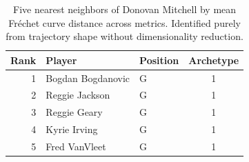 \begin{table}[htbp]
  \centering\small
  \begin{tabular}{rllc}
    \toprule
    Rank & Player & Position & Archetype \\
    \midrule
    1 & Bogdan Bogdanovic & G & 1 \\
    2 & Reggie Jackson & G & 1 \\
    3 & Reggie Geary & G & 1 \\
    4 & Kyrie Irving & G & 1 \\
    5 & Fred VanVleet & G & 1 \\
    \bottomrule
  \end{tabular}
  \caption{Five nearest neighbors of Donovan Mitchell by mean Fr\'{e}chet curve distance across metrics. Identified purely from trajectory shape without dimensionality reduction.}
  \label{tab:Donovan_Mitchell_frechet_curve_neighbors}
\end{table}

